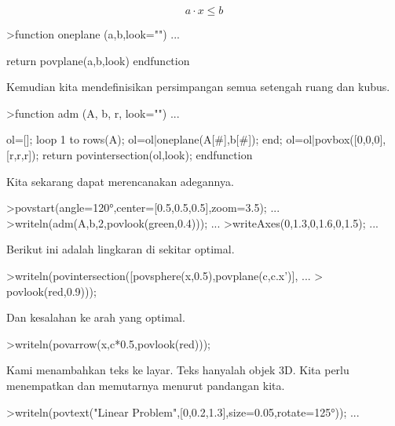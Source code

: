 \documentclass{article}
\begin{document}
\begin{eulernotebook}
\begin{eulercomment}
\begin{eulercomment}
\begin{eulercomment}
\end{eulercomment}
\begin{eulerformula}
\[
a \cdot x \le b
\]
\end{eulerformula}
\begin{eulerprompt}
>function oneplane (a,b,look="") ...
\end{eulerprompt}
\begin{eulerudf}
    return povplane(a,b,look)
  endfunction
\end{eulerudf}
\begin{eulercomment}
Kemudian kita mendefinisikan persimpangan semua setengah ruang dan
kubus.
\end{eulercomment}
\begin{eulerprompt}
>function adm (A, b, r, look="") ...
\end{eulerprompt}
\begin{eulerudf}
    ol=[];
    loop 1 to rows(A); ol=ol|oneplane(A[#],b[#]); end;
    ol=ol|povbox([0,0,0],[r,r,r]);
    return povintersection(ol,look);
  endfunction
\end{eulerudf}
\begin{eulercomment}
Kita sekarang dapat merencanakan adegannya.
\end{eulercomment}
\begin{eulerprompt}
>povstart(angle=120°,center=[0.5,0.5,0.5],zoom=3.5); ...
>writeln(adm(A,b,2,povlook(green,0.4))); ...
>writeAxes(0,1.3,0,1.6,0,1.5); ...
\end{eulerprompt}
\begin{eulercomment}
Berikut ini adalah lingkaran di sekitar optimal.
\end{eulercomment}
\begin{eulerprompt}
>writeln(povintersection([povsphere(x,0.5),povplane(c,c.x')], ...
>  povlook(red,0.9)));
\end{eulerprompt}
\begin{eulercomment}
Dan kesalahan ke arah yang optimal.
\end{eulercomment}
\begin{eulerprompt}
>writeln(povarrow(x,c*0.5,povlook(red)));
\end{eulerprompt}
\begin{eulercomment}
Kami menambahkan teks ke layar. Teks hanyalah objek 3D. Kita perlu
menempatkan dan memutarnya menurut pandangan kita.
\end{eulercomment}
\begin{eulerprompt}
>writeln(povtext("Linear Problem",[0,0.2,1.3],size=0.05,rotate=125°)); ...

\end{eulerprompt}
\end{eulercomment}
\end{eulercomment}
\end{eulernotebook}
\end{document}
